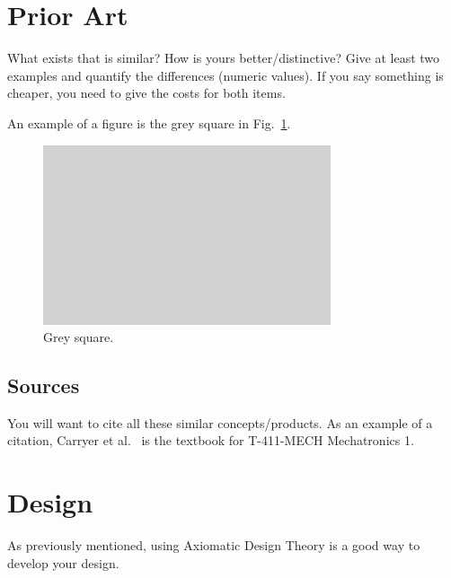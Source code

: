 \documentclass[twocolumn]{webofc}
\begin{document}
\section{Prior Art}
What exists that is similar?  How is yours better/distinctive?
Give at least two examples and quantify the differences (numeric values).
If you say something is cheaper, you need to give the costs for both items.

An example of a figure is the grey square in Fig.~\ref{fig:grey-square}.
\begin{figure}
  \centering
  \includegraphics[width=\columnwidth]{grey-square}
  \caption{Grey square.}\label{fig:grey-square}
\end{figure}



\subsection*{Sources}
You will want to cite all these similar concepts/products.
As an example of a citation, Carryer et al.~\cite{carryer2011IntroMechatronics} is the textbook for T-411-MECH Mechatronics 1.


\section{Design}
As previously mentioned, using Axiomatic Design Theory is a good way to develop your design.
\end{document}
